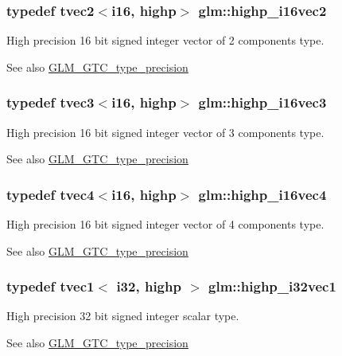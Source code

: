 \subsubsection[{highp\+\_\+i16vec2}]{\setlength{\rightskip}{0pt plus 5cm}typedef tvec2$<${\bf i16}, highp$>$ {\bf glm\+::highp\+\_\+i16vec2}}\label{namespaceglm_a9a46126d0bf9ceb121df6109ac8da717}
High precision 16 bit signed integer vector of 2 components type. \begin{DoxySeeAlso}{See also}
\hyperlink{group__gtc__type__precision}{G\+L\+M\+\_\+\+G\+T\+C\+\_\+type\+\_\+precision} 
\end{DoxySeeAlso}
\hypertarget{namespaceglm_a197812ee8b57e9c7b4fca157443426a1}{}
\subsubsection[{highp\+\_\+i16vec3}]{\setlength{\rightskip}{0pt plus 5cm}typedef tvec3$<${\bf i16}, highp$>$ {\bf glm\+::highp\+\_\+i16vec3}}\label{namespaceglm_a197812ee8b57e9c7b4fca157443426a1}
High precision 16 bit signed integer vector of 3 components type. \begin{DoxySeeAlso}{See also}
\hyperlink{group__gtc__type__precision}{G\+L\+M\+\_\+\+G\+T\+C\+\_\+type\+\_\+precision} 
\end{DoxySeeAlso}
\hypertarget{namespaceglm_a08c1756ac7347ffb0aaa2eba3c200e1e}{}
\subsubsection[{highp\+\_\+i16vec4}]{\setlength{\rightskip}{0pt plus 5cm}typedef tvec4$<${\bf i16}, highp$>$ {\bf glm\+::highp\+\_\+i16vec4}}\label{namespaceglm_a08c1756ac7347ffb0aaa2eba3c200e1e}
High precision 16 bit signed integer vector of 4 components type. \begin{DoxySeeAlso}{See also}
\hyperlink{group__gtc__type__precision}{G\+L\+M\+\_\+\+G\+T\+C\+\_\+type\+\_\+precision} 
\end{DoxySeeAlso}
\hypertarget{namespaceglm_ad38568f19fc1dac06f1f3478689caf0e}{}
\subsubsection[{highp\+\_\+i32vec1}]{\setlength{\rightskip}{0pt plus 5cm}typedef tvec1$<$ {\bf i32}, highp $>$ {\bf glm\+::highp\+\_\+i32vec1}}\label{namespaceglm_ad38568f19fc1dac06f1f3478689caf0e}
High precision 32 bit signed integer scalar type. \begin{DoxySeeAlso}{See also}
\hyperlink{group__gtc__type__precision}{G\+L\+M\+\_\+\+G\+T\+C\+\_\+type\+\_\+precision} 
\end{DoxySeeAlso}
\hypertarget{namespaceglm_a88f1af6328724a83287eb1fbc3471171}{}
